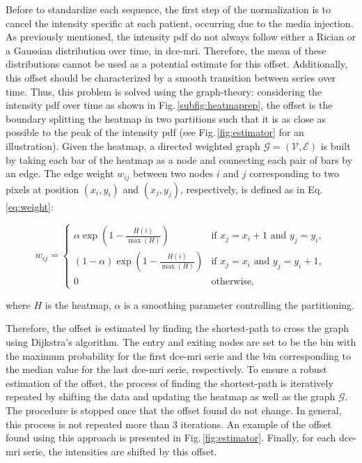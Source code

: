 Before to standardize each sequence, the first step of the normalization is to cancel the intensity specific at each patient, occurring due to the media injection.
As previously mentioned, the intensity \ac{pdf} do not always follow either a Rician or a Gaussian distribution over time, in \ac{dce}-\ac{mri}.
Therefore, the mean of these distributions cannot be used as a potential estimate for this offset.
Additionally, this offset should be characterized by a smooth transition between series over time.
Thus, this problem is solved using the graph-theory: considering the intensity \ac{pdf} over time as shown in Fig.\,\ref{subfig:heatmaprep}, the offset is the boundary splitting the heatmap in two partitions such that it is as close as possible to the peak of the intensity \ac{pdf} (see Fig.\,\ref{fig:estimator} for an illustration).
Given the heatmap, a directed weighted graph $\mathcal{G}=(\mathcal{V}, \mathcal{E})$ is built by taking each bar of the heatmap as a node and connecting each pair of bars by an edge.
The edge weight $w_{ij}$ between two nodes $i$ and $j$ corresponding to two pixels at position $(x_i, y_i)$ and $(x_j, y_j)$, respectively, is defined as in Eq.\,\eqref{eq:weight}:

\begin{equation}
  w_{ij} = \begin{cases}
    \alpha \exp(1 - \frac{H(i)}{\max(H)})       & \text{if } x_j = x_i + 1 \text{ and } y_j = y_i, \\
    (1 - \alpha) \exp(1 - \frac{H(i)}{\max(H)}) & \text{if } x_j = x_i \text{ and } y_j = y_i + 1, \\
    0                                           & \text{otherwise},
  \end{cases}
  \label{eq:weight}
\end{equation}

\noindent where $H$ is the heatmap, $\alpha$ is a smoothing parameter controlling the partitioning.

Therefore, the offset is estimated by finding the shortest-path to cross the graph using Dijkstra's algorithm.
The entry and exiting nodes are set to be the bin with the maximum probability for the first \ac{dce}-\ac{mri} serie and the bin corresponding to the median value for the last \ac{dce}-\ac{mri} serie, respectively.
To ensure a robust estimation of the offset, the process of finding the shortest-path is iteratively repeated by shifting the data and updating the heatmap as well as the graph $\mathcal{G}$.
The procedure is stopped once that the offset found do not change.
In general, this process is not repeated more than 3 iterations.
An example of the offset found using this approach is presented in Fig.\,\ref{fig:estimator}.
Finally, for each \ac{dce}-\ac{mri} serie, the intensities are shifted by this offset.

